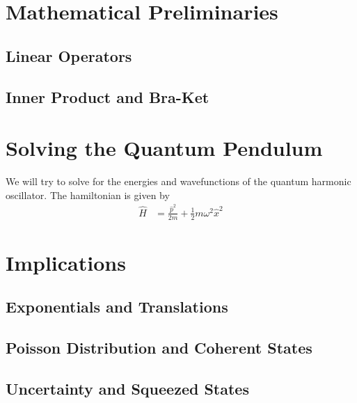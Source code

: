 \documentclass[a4paper]{article}
\numberwithin{equation}{section}
\begin{document}
\section{Mathematical Preliminaries}

\subsection{Linear Operators}

\subsection{Inner Product and Bra-Ket}




\section{Solving the Quantum Pendulum}

We will try to solve for the energies and wavefunctions of the quantum harmonic oscillator. The hamiltonian is given by
\begin{align}
    \hat H&=\frac{\hat p^2}{2m}+\frac{1}{2}m\omega^2\hat x^2\label{qho_hamiltonian}
\end{align}





\section{Implications}

\subsection{Exponentials and Translations}

\subsection{Poisson Distribution and Coherent States}

\subsection{Uncertainty and Squeezed States}

\begin{thebibliography}{99}

\end{thebibliography}
\end{document}
